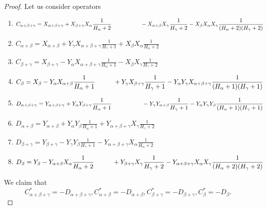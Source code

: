 \documentclass[twoside,a4paper,12pt]{article}
\theoremstyle{definition}
\newcommand{\ds}{\displaystyle}
\begin{document}
\begin{proof}
	Let us consider operators
	\begin{enumerate}
		\item $\ds C_{\alpha+\beta+\gamma}=X_{\alpha+\beta+\gamma}
			+X_{\beta+\gamma}X_\alpha\frac1{H_\alpha+2}\\
			\hspace*{18mm}-X_{\alpha+\beta}X_\gamma\frac1{H_\gamma+2}
			-X_\beta X_\alpha X_\gamma\frac1{(H_\alpha+2)(H_\gamma+2)}$
		\item $\ds C_{\alpha+\beta}=X_{\alpha+\beta}
			+Y_\gamma X_{\alpha+\beta+\gamma}\frac1{H_\gamma+1}
			+X_\beta X_\alpha\frac1{H_\alpha+2}$
		\item $\ds C_{\beta+\gamma}=X_{\beta+\gamma}
			-Y_\alpha X_{\alpha+\beta+\gamma}\frac1{H_\alpha+1}
			-X_\beta X_\gamma\frac1{H_\gamma+2}$
		\item $\ds C_{\beta}=X_{\beta}
			-Y_\alpha X_{\alpha+\beta}\frac1{H_\alpha+1}\\
			\hspace*{10mm}+Y_\gamma X_{\beta+\gamma}\frac1{H_\gamma+1}
			-Y_\alpha Y_\gamma X_{\alpha+\beta+\gamma}
			\frac1{(H_\alpha+1)(H_\gamma+1)}$
		\item $\ds D_{\alpha+\beta+\gamma}=Y_{\alpha+\beta+\gamma}
			+Y_\alpha Y_{\beta+\gamma}\frac1{H_\alpha+1}\\
			\hspace*{18mm}-Y_\gamma Y_{\alpha+\beta}\frac1{H_\gamma+1}
			-Y_\alpha Y_\gamma Y_\beta\frac1{(H_\alpha+1)(H_\gamma+1)}$
		\item $\ds D_{\alpha+\beta}=Y_{\alpha+\beta}
			+Y_\alpha Y_\beta\frac1{H_\alpha+1}
			+Y_{\alpha+\beta+\gamma}X_\gamma\frac1{H_\gamma+2}$
		\item $\ds D_{\beta+\gamma}=Y_{\beta+\gamma}
			-Y_\gamma Y_\beta\frac1{H_\gamma+1}
			-Y_{\alpha+\beta+\gamma}X_\alpha\frac1{H_\alpha+2}$
		\item $\ds D_\beta=Y_\beta
			-Y_{\alpha+\beta}X_\alpha\frac1{H_\alpha+2}\\
			\hspace*{10mm}+Y_{\beta+\gamma}X_\gamma\frac1{H_\gamma+2}
			-Y_{\alpha+\beta+\gamma}X_\alpha
			X_\gamma\frac1{(H_\alpha+2)(H_\gamma+2)}$
	\end{enumerate}
	We claim that
	\begin{equation*}
		C_{\alpha+\beta+\gamma}^*=-D_{\alpha+\beta+\gamma},
		C_{\alpha+\beta}^*=-D_{\alpha+\beta},
		C_{\beta+\gamma}^*=-D_{\beta+\gamma},
		C_\beta^*=-D_\beta.
	\end{equation*}

\end{proof}
\end{document}
